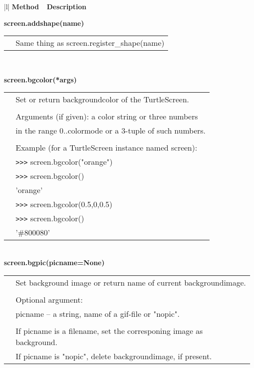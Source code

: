 \begin{center}
{\small
\begin{tabular}{|l|} \hline
{\bf Method~~Description} \\ \hline\hline 

{\bf    screen.addshape(name)} \\
   \begin{tabular}{p{0.25in}p{4in}}
&  Same thing as screen.register\_shape(name) \\
\end{tabular} \\ \hline

{\bf    screen.bgcolor(*args)} \\
   \begin{tabular}{p{0.25in}p{4in}}
&        Set or return backgroundcolor of the TurtleScreen. \\
&  \\
&        Arguments (if given): a color string or three numbers \\
&        in the range 0..colormode or a 3-tuple of such numbers. \\
&  \\
&        Example (for a TurtleScreen instance named screen): \\
&        \verb+>+\verb+>+\verb+>+ screen.bgcolor("orange") \\
&        \verb+>+\verb+>+\verb+>+ screen.bgcolor() \\
&        'orange' \\
&        \verb+>+\verb+>+\verb+>+ screen.bgcolor(0.5,0,0.5) \\
&        \verb+>+\verb+>+\verb+>+ screen.bgcolor() \\
&        '\#800080' \\
\end{tabular} \\ \hline
{\bf    screen.bgpic(picname=None)} \\
   \begin{tabular}{p{0.25in}p{4in}}
&        Set background image or return name of current backgroundimage. \\
&  \\
&        Optional argument: \\
&        picname -- a string, name of a gif-file or "nopic". \\
&  \\
&        If picname is a filename, set the corresponing image as background. \\
&        If picname is "nopic", delete backgroundimage, if present. \\

\end{tabular}
\end{tabular}}
\end{center}
